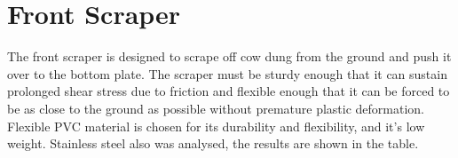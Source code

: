 \section{Front Scraper} \label{Front Scraper 1}
The front scraper is designed to scrape off cow dung from the ground and push it over to the bottom plate. The scraper must be sturdy enough that it can sustain prolonged shear stress due to friction and flexible enough that it can be forced to be as close to the ground as possible without premature plastic deformation. Flexible PVC material is chosen for its durability and flexibility, and it's low weight. Stainless steel also was analysed, the results are shown in the table.
\begin{table}[!ht]
\caption{Stress and Displacement Analysis of Front Scraper}
\end{table}

